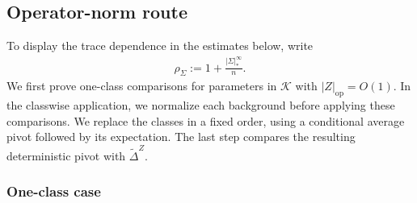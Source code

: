 \documentclass[EJP, preprint, NODS, nobera, nofontexpansion]{ejpecp}
\DeclareMathOperator{\op}{op}
\begin{document}
\subsection{Operator-norm route}
\label{sse:operator_profile_route}

To display the trace dependence in the estimates below, write
\begin{align}\label{eq:def_rho_profile}
    \rho_\Sigma:=1+\frac{|\Sigma|_*^\infty}n.
\end{align}
We first prove one-class comparisons for parameters in \(\mathcal K\)
with \(|Z|_{\op}=O(1)\).
In the classwise application, we normalize each background before applying
these comparisons. We replace the classes in a fixed order, using a
conditional average pivot followed by its expectation. The last step
compares the resulting deterministic pivot with $\widetilde\Delta^Z$.

\subsubsection{One-class case}
\end{document}
